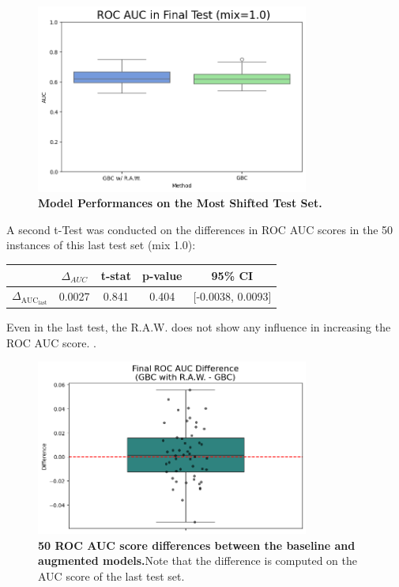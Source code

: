 \begin{figure}[H]
    \centering
    \includegraphics[width=0.8\textwidth]{assets/RealRawLAST.png} 
    \caption{\textbf{Model Performances on the Most Shifted Test Set.}}
\end{figure}

A second t-Test was conducted on the differences in ROC AUC scores in the 50 instances of this last test set (mix 1.0):


\begin{table}[H]
    \centering
    \begin{tabular}{lcccc}
        \toprule
        & $\Delta_{AUC}$ & t-stat & p-value & 95\% CI \\
        \midrule
        $\Delta_{\text{AUC}_{\text{last}}}$ & 0.0027 & 0.841 & 0.404 & [-0.0038, 0.0093] \\
        \bottomrule
    \end{tabular}
\end{table}

Even in the last test, the R.A.W. does not show any influence in increasing the ROC AUC score. . 

\begin{figure}[H]
    \centering
    \includegraphics[width=0.8\textwidth]{assets/RealRawDiffLAST.png} 
    \caption{\textbf{50 ROC AUC score differences between the baseline and augmented models.}Note that the difference is computed on the AUC score of the last test set.}
\end{figure}



